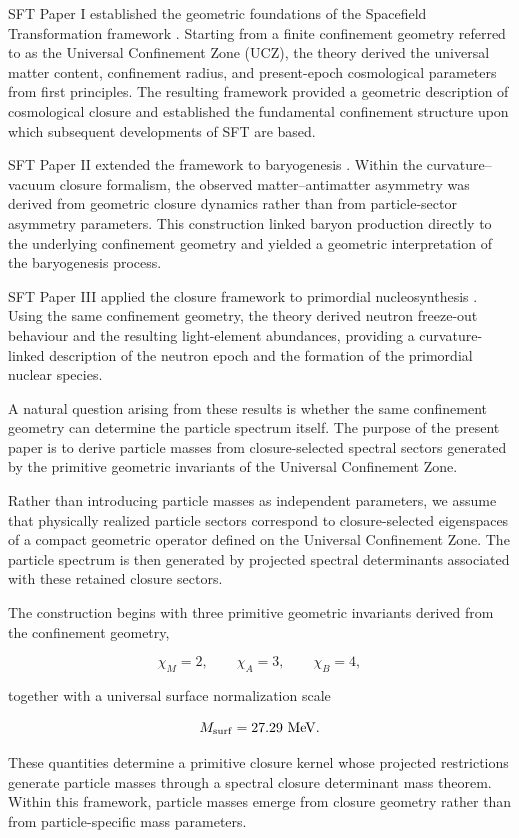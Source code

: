 \documentclass[11pt]{article}
\theoremstyle{definition}
\theoremstyle{remark}
\begin{document}
SFT Paper I established the geometric foundations of the
Spacefield Transformation framework \cite{Egbon2025I}. Starting
from a finite confinement geometry referred to as the Universal
Confinement Zone (UCZ), the theory derived the universal matter
content, confinement radius, and present-epoch cosmological
parameters from first principles. The resulting framework
provided a geometric description of cosmological closure and
established the fundamental confinement structure upon which
subsequent developments of SFT are based.

SFT Paper II extended the framework to baryogenesis
\cite{Egbon2025II}. Within the curvature--vacuum closure
formalism, the observed matter--antimatter asymmetry was derived
from geometric closure dynamics rather than from particle-sector
asymmetry parameters. This construction linked baryon production
directly to the underlying confinement geometry and yielded a
geometric interpretation of the baryogenesis process.

SFT Paper III applied the closure framework to primordial
nucleosynthesis \cite{Egbon2025III}. Using the same confinement
geometry, the theory derived neutron freeze-out behaviour and
the resulting light-element abundances, providing a
curvature-linked description of the neutron epoch and the
formation of the primordial nuclear species.

A natural question arising from these results is whether the
same confinement geometry can determine the particle spectrum
itself. The purpose of the present paper is to derive particle masses
from closure-selected spectral sectors generated by the
primitive geometric invariants of the Universal Confinement
Zone.

Rather than introducing particle masses as independent
parameters, we assume that physically realized particle sectors
correspond to closure-selected eigenspaces of a compact
geometric operator defined on the Universal Confinement Zone.
The particle spectrum is then generated by projected spectral
determinants associated with these retained closure sectors.

The construction begins with three primitive geometric
invariants derived from the confinement geometry,

\[
\chi_M = 2,
\qquad
\chi_A = 3,
\qquad
\chi_B = 4,
\]

together with a universal surface normalization scale

\[
M_{\rm surf}
=
27.29~{\rm MeV}.
\]

These quantities determine a primitive closure kernel whose
projected restrictions generate particle masses through a
spectral closure determinant mass theorem. Within this
framework, particle masses emerge from closure geometry rather
than from particle-specific mass parameters.
\end{document}
